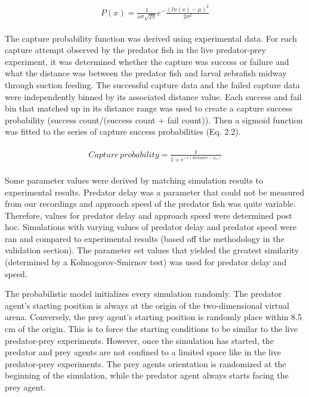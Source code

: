 \documentclass[]{rsos}%
\begin{document}
\begin{align}\label{1.1} %
\begin{split}
P(x) = \frac{1}{x\sigma \sqrt{2 \pi}} e^-{\frac{(ln(x)-\mu)^2}{2\sigma ^2}}
\end{split}
\end{align}

The capture probability function was derived using experimental data. For each capture attempt observed by the predator fish in the live predator-prey experiment, it was determined whether the capture was success or failure and what the distance was between the predator fish and larval zebrafish midway through suction feeding. The successful capture data and the failed capture data were independently binned by its associated distance value. Each success and fail bin that matched up in its distance range was used to create a capture success probability (success count/(success count + fail count)). Then a sigmoid function was fitted to the series of capture success probabilities (Eq. 2.2).

\begin{align}\label{1.2} %
\begin{split}
Capture\,probability = \frac{1}{1+e^{-r(distance-x_0)}}
\end{split}
\end{align}

Some parameter values were derived by matching simulation results to experimental results. Predator delay was a parameter that could not be measured from our recordings and approach speed of the predator fish was quite variable. Therefore, values for predator delay and approach speed were determined post hoc. Simulations with varying values of predator delay and predator speed were ran and compared to experimental results (based off the methodology in the validation section). The parameter set values that yielded the greatest similarity (determined by a Kolmogorov-Smirnov test) was used for predator delay and speed.

The probabilistic model initializes every simulation randomly. The predator agent’s starting position is always at the origin of the two-dimensional virtual arena. Conversely, the prey agent’s starting position is randomly place within 8.5 cm of the origin. This is to force the starting conditions to be similar to the live predator-prey experiments. However, once the simulation has started, the predator and prey agents are not confined to a limited space like in the live predator-prey experiments. The prey agent\textsc{}s orientation is randomized at the beginning of the simulation, while the predator agent always starts facing the prey agent.
\end{document}
